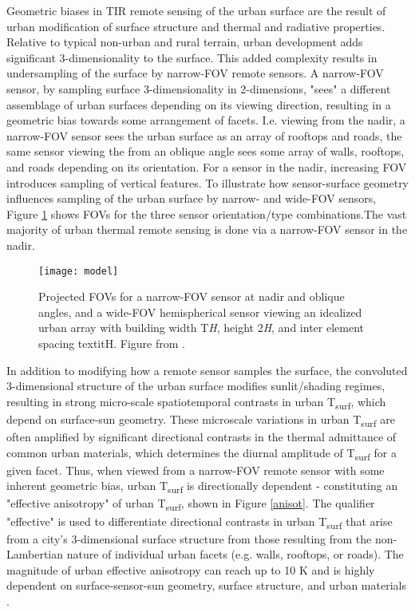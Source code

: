 \begin{bibunit}
Geometric biases in TIR remote sensing of the urban surface are the result of urban modification of surface structure and thermal and radiative properties. Relative to typical non-urban and rural terrain, urban development adds significant 3-dimensionality to the surface. This added complexity results in undersampling of the surface by narrow-FOV remote sensors. A narrow-FOV sensor, by sampling surface 3-dimensionality in 2-dimensions, "sees" a different assemblage of urban surfaces depending on its viewing direction, resulting in a geometric bias towards some arrangement of facets. I.e. viewing from the nadir, a narrow-FOV sensor sees the urban surface as an array of rooftops and roads, the same sensor viewing the from an oblique angle sees some array of walls, rooftops, and roads depending on its orientation. For a sensor in the nadir, increasing FOV introduces sampling of vertical features. To illustrate how sensor-surface geometry influences sampling of the urban surface by narrow- and wide-FOV sensors, Figure \ref{model} shows FOVs for the three sensor orientation/type combinations.The vast majority of urban thermal remote sensing is done via a narrow-FOV sensor in the nadir.

\begin{figure}[H]
	\centering
	\texttt{[image: model]}
	\caption{Projected FOVs for a narrow-FOV sensor at nadir and oblique angles, and a wide-FOV hemispherical sensor viewing an idealized urban array with building width T\textit{H}, height 2\textit{H}, and inter element spacing textit{H}. Figure from \cite{Adderley2015}.}
	\label{model}
\end{figure}


In addition to modifying how a remote sensor samples the surface, the convoluted 3-dimensional structure of the urban surface modifies sunlit/shading regimes, resulting in strong micro-scale spatiotemporal contrasts in urban T\textsubscript{surf}, which depend on surface-sun geometry. These microscale variations in urban T\textsubscript{surf} are often amplified by significant directional contrasts in the thermal admittance of common urban materials, which determines the diurnal amplitude of T\textsubscript{surf} for a given facet. Thus, when viewed from a narrow-FOV remote sensor with some inherent geometric bias, urban T\textsubscript{surf} is directionally dependent - constituting an "effective anisotropy" of urban T\textsubscript{surf}, shown in Figure \ref{anisot}. The qualifier "effective" is used to differentiate directional contrasts in urban T\textsubscript{surf} that arise from a city's 3-dimensional surface structure from those resulting from the non-Lambertian nature of individual urban facets (e.g. walls, rooftops, or roads). The magnitude of urban effective anisotropy can reach up to 10 \si{\kelvin} and is highly dependent on surface-sensor-sun geometry, surface structure, and urban materials \citep{Krayenhoff2016, Voogt1997}. 


\end{bibunit}
